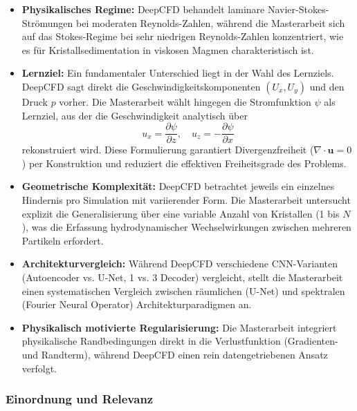\documentclass[a4paper,12pt]{article}
\begin{document}
\begin{itemize}
    \item \textbf{Physikalisches Regime:} DeepCFD behandelt laminare Navier-Stokes-Strömungen bei moderaten Reynolds-Zahlen, während die Masterarbeit sich auf das Stokes-Regime bei sehr niedrigen Reynolds-Zahlen konzentriert, wie es für Kristallsedimentation in viskosen Magmen charakteristisch ist.
    
    \item \textbf{Lernziel:} Ein fundamentaler Unterschied liegt in der Wahl des Lernziels. DeepCFD sagt direkt die Geschwindigkeitskomponenten $(U_x, U_y)$ und den Druck $p$ vorher. Die Masterarbeit wählt hingegen die Stromfunktion $\psi$ als Lernziel, aus der die Geschwindigkeit analytisch über
    \begin{equation*}
        u_x = \frac{\partial \psi}{\partial z}, \quad u_z = -\frac{\partial \psi}{\partial x}
    \end{equation*}
    rekonstruiert wird. Diese Formulierung garantiert Divergenzfreiheit ($\nabla \cdot \mathbf{u} = 0$) per Konstruktion und reduziert die effektiven Freiheitsgrade des Problems.
    
    \item \textbf{Geometrische Komplexität:} DeepCFD betrachtet jeweils ein einzelnes Hindernis pro Simulation mit variierender Form. Die Masterarbeit untersucht explizit die Generalisierung über eine variable Anzahl von Kristallen (1 bis $N$), was die Erfassung hydrodynamischer Wechselwirkungen zwischen mehreren Partikeln erfordert.
    
    \item \textbf{Architekturvergleich:} Während DeepCFD verschiedene CNN-Varianten (Autoencoder vs. U-Net, 1 vs. 3 Decoder) vergleicht, stellt die Masterarbeit einen systematischen Vergleich zwischen räumlichen (U-Net) und spektralen (Fourier Neural Operator) Architekturparadigmen an.
    
    \item \textbf{Physikalisch motivierte Regularisierung:} Die Masterarbeit integriert physikalische Randbedingungen direkt in die Verlustfunktion (Gradienten- und Randterm), während DeepCFD einen rein datengetriebenen Ansatz verfolgt.
\end{itemize}

\subsubsection*{Einordnung und Relevanz}
\end{document}
